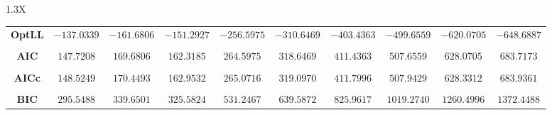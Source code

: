 \documentclass[10pt]{article}
\begin{document}
{\begin{tabularx}{1.3\textwidth}{X}
{\begin{tabular}{cccccccccc}
\cmidrule(r){1-10} \\
 { {\bf OptLL} }& $-137.0339$ & $-161.6806$ & $-151.2927$ & $-256.5975$ & $-310.6469$ & $-403.4363$ & $-499.6559$& $-620.0705$& $-648.6887$ \\
\cmidrule(r){1-10} \\
 { {\bf AIC} }& $147.7208$ & $169.6806$ & $162.3185$ & $264.5975$ & $318.6469$ & $411.4363$ & $507.6559$& $628.0705$& $683.7173$ \\
\cmidrule(r){1-10} \\
 { {\bf AICc} }& $148.5249$ & $170.4493$ & $162.9532$ & $265.0716$ & $319.0970$ & $411.7996$ & $507.9429$& $628.3312$& $683.9361$ \\
\cmidrule(r){1-10} \\
 { {\bf BIC} }& $295.5488$ & $339.6501$ & $325.5824$ & $531.2467$ & $639.5872$ & $825.9617$ & $1019.2740$& $1260.4996$& $1372.4488$ \\
\bottomrule
\end{tabular}}
\end{tabularx}}

  \vspace{3 cm}

  
\end{document}
